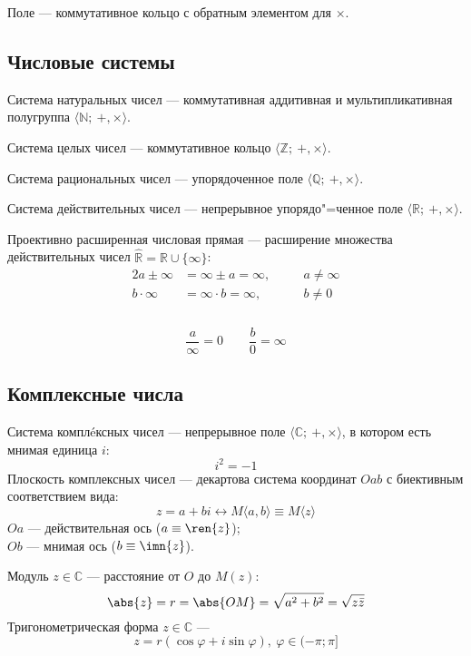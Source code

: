 {\ital Поле} --- коммутативное кольцо с обратным элементом для $\times$.

\subsection{Числовые системы}

{\ital Система натуральных чисел} --- коммутативная аддитивная и мультипликативная полугруппа $\langle\mathbb{N};\ +,\times\rangle$.\par

{\ital Система целых чисел} --- коммутативное кольцо $\langle\mathbb{Z};\ +,\times\rangle$.
\par

{\ital Система рациональных чисел} --- упорядоченное поле $\langle\mathbb{Q};\ +,\times
\rangle$.\par

{\ital Система действительных чисел} --- непрерывное упорядо"=ченное поле $\langle\mathbb
{R};\ +,\times\rangle$.

{\ital Проективно расширенная числовая прямая} --- расширение множества действительных 
чисел $\widehat{\mathbb{R}}=\mathbb{R}\cup\{\infty\}$:
\begin{alignat*}{2}
a\pm\infty&=\infty\pm a=\infty,\quad &&a\neq\infty\\
b\cdot\infty&=\infty\cdot b=\infty, &&b\neq 0\\
\end{alignat*}\\[-26pt]
$$\frac{a}{\infty}=0\quad\quad\frac{b}{0}=\infty$$

\newpage
\subsection{Комплексные числа}

{\bold Система комплéксных чисел} --- непрерывное поле $\langle\mathbb{C};\ +,
\times\rangle$, в котором есть {\ital мнимая единица} $i$:
$$i^2=-1$$
{\bold Плоскость комплексных чисел} --- декартова система координат $Oab$ с биективным соответствием вида:
$$z=a+bi\leftrightarrow M\langle a,b\rangle\equiv M\langle z\rangle$$
$Oa$ --- действительная ось {\ital\color{desc}($a\equiv\ren{z}$)};\\
$Ob$ --- мнимая ось {\ital\color{desc}($b\equiv\imn{z}$)}.

{\ital Модуль} $z\in\mathbb{C}$ --- расстояние от $O$ до $M(z)$:
$$\abs{z}=r=\abs{OM}=\sqrt{a^2+b^2}=\sqrt{z\bar{z}}$$
Тригонометрическая форма $z\in\mathbb{C}$ ---
$$z=r(\cos\varphi+i\sin\varphi),\ \varphi\in(-\pi;\pi]$$\\

